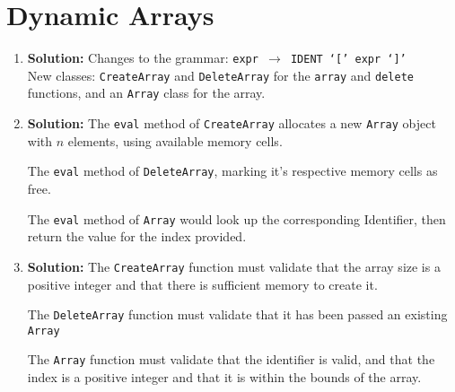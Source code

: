 \documentclass{article}
\begin{document}
\section{Dynamic Arrays}
\begin{enumerate}
    \item \textbf{Solution:} Changes to the grammar:  \texttt{expr $\to$ IDENT `[' expr `]' } \\ New classes: \texttt{CreateArray} and \texttt{DeleteArray} for the \texttt{array} and \texttt{delete} functions, and an \texttt{Array} class for the array.
    \item \textbf{Solution:}
        The \texttt{eval} method of \texttt{CreateArray} allocates a new \texttt{Array} object with $n$ elements, using available memory cells. 

The \texttt{eval} method of \texttt{DeleteArray}, marking it's respective memory cells as free. 

The \texttt{eval} method of \texttt{Array} would look up the corresponding Identifier, then return the value for the index provided.
    \item \textbf{Solution:}
        The \texttt{CreateArray} function must validate that the array size is a positive integer and that there is sufficient memory to create it.

The \texttt{DeleteArray} function must validate that it has been passed an existing \texttt{Array}

The \texttt{Array} function must validate that the identifier is valid, and that the index is a positive integer and that it is within the bounds of the array.

\end{enumerate}
\end{document}
